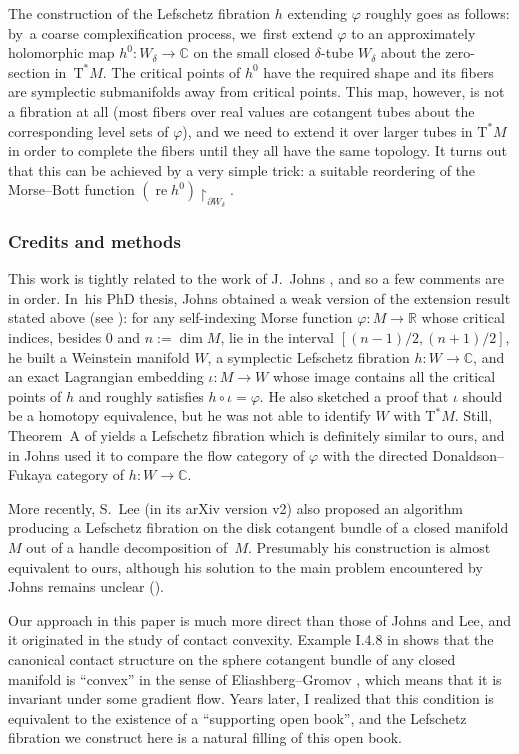 \documentclass[JEP,XML,SOM,Unicode]{cedram}
\newcommand{\C}{{\mathbb C}}
\newcommand{\R}{{\mathbb R}}
\newcommand{\re}{\operatorname{re}}
\newcommand{\sT}{\mathrm{T}^\ast}
\newcommand{\de}{\mathrel{:=}}
\newcommand{\rst}[1]{{\upharpoonright}_{\!#1}}
\let\del\partial
\let\on\colon
\theoremstyle{plain}
\theoremstyle{definition}
\begin{document}
The construction of the Lefschetz fibration $h$ extending $\varphi$ roughly goes
as follows: by~a coarse complexification process, we~first extend $\varphi$ to
an approximately holomorphic map $h^0 \on W_\delta \to \C$ on the small closed
$\delta$-tube $W_\delta$ about the zero-section in~$\sT M$. The critical points
of $h^0$ have the required shape and its fibers are symplectic submanifolds away
from critical points. This map, however, is not a fibration at all (most fibers
over real values are cotangent tubes about the corresponding level sets of
$\varphi$), and we need to extend it over larger tubes in $\sT M$ in order to
complete the fibers until they all have the same topology. It turns out that
this can be achieved by a very simple trick: a suitable reordering of the
Morse--Bott function $(\re h^0) \rst{ \del W_\delta }$.

\subsubsection*{Credits and methods}

This work is tightly related to the work of J.~Johns \cite{Jo1}, and so a few
comments are in order. In~his PhD thesis, Johns obtained a weak version of the
extension result stated above (see \cite[Th.\,A]{Jo1}): for any self-indexing
Morse function $\varphi \on M \to \R$ whose critical indices, besides $0$ and
$n \de \dim M$, lie in the interval $[(n-1)/2,(n+1)/2]$, he built a Weinstein
manifold $W$, a symplectic Lefschetz fibration $h \on W \to \C$, and an exact
Lagrangian embedding $\iota \on M \to W$ whose image contains all the critical
points of $h$ and roughly satisfies $h \circ \iota = \varphi$. He also sketched
a proof that $\iota$ should be a homotopy equivalence, but he was not able to
identify $W$ with $\sT M$. Still, Theorem~A of \cite{Jo1} yields a Lefschetz
fibration which is definitely similar to ours, and in \cite{Jo2} Johns used it
to compare the flow category of $\varphi$ with the directed Donaldson--Fukaya
category of $h \on W \to \C$.

More recently, S.~Lee \cite{Le} (in its arXiv version v2) also proposed an algorithm producing a Lefschetz
fibration on the disk cotangent bundle of a closed manifold $M$ out of a handle
decomposition of~$M$. Presumably his construction is almost equivalent to ours,
although his solution to the main problem encountered by Johns remains unclear
(\cf \cite[\S6.3 of the arXiv version v2]{Le}).

Our approach in this paper is much more direct than those of Johns and Lee, and
it originated in the study of contact convexity. Example I.4.8 in \cite{Gi}
shows that the canonical contact structure on the sphere cotangent bundle of any
closed manifold is ``convex'' in the sense of Eliashberg--Gromov \cite{EG},
which means that it is invariant under some gradient flow. Years later, I
realized that this condition is equivalent to the existence of a ``supporting
open book'', and the Lefschetz fibration we construct here is a natural filling
of this open book.
\end{document}
